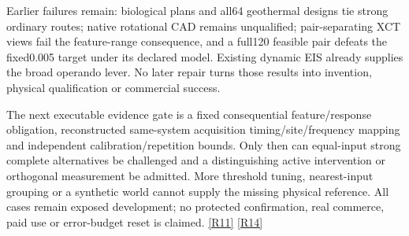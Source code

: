 \documentclass[10pt,letterpaper]{article}
\begin{document}
Earlier failures remain: biological plans and all64 geothermal designs tie strong ordinary routes; native rotational CAD remains unqualified; pair-separating XCT views fail the feature-range consequence, and a full120 feasible pair defeats the fixed0.005 target under its declared model. Existing dynamic EIS already supplies the broad operando lever. No later repair turns those results into invention, physical qualification or commercial success. \par
The next executable evidence gate is a fixed consequential feature/response obligation, reconstructed same-system acquisition timing/site/frequency mapping and independent calibration/repetition bounds. Only then can equal-input strong complete alternatives be challenged and a distinguishing active intervention or orthogonal measurement be admitted. More threshold tuning, nearest-input grouping or a synthetic world cannot supply the missing physical reference. All cases remain exposed development; no protected confirmation, real commerce, paid use or error-budget reset is claimed. \href{https://github.com/MontrealAI/AGI-Alpha-Invention-Flywheel-Lab/blob/54f229bb0672201dd635a46f8edd71083f1e7bfe/research/eis008/paired-audit/GATE_UPDATE.json}{[R11]} \href{https://github.com/MontrealAI/AGI-Alpha-Invention-Flywheel-Lab/blob/54f229bb0672201dd635a46f8edd71083f1e7bfe/campaign/overnight-008/economics/recovery/FINAL_COST_SNAPSHOT_EVENT28.json}{[R14]}\par
\end{document}
